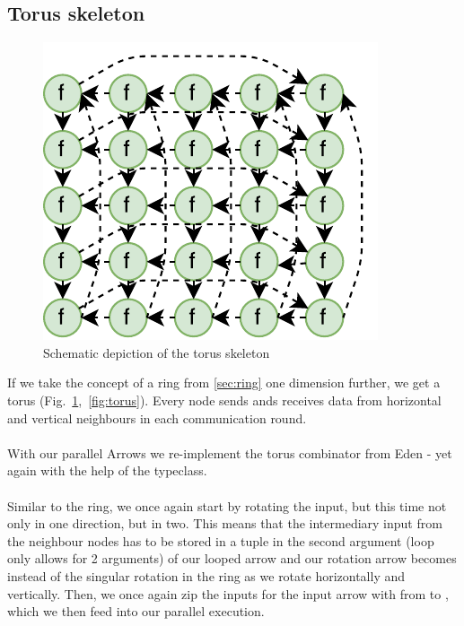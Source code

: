 \subsection{Torus skeleton}
\begin{figure}
	\includegraphics[scale=0.75]{images/torus}
	\caption{Schematic depiction of the torus skeleton}
	\label{fig:ringTorusImg}
\end{figure}
If we take the concept of a ring from \ref{sec:ring} one dimension further, we get a torus (Fig.~\ref{fig:ringTorusImg},~\ref{fig:torus}). Every node sends ands receives data from horizontal and vertical neighbours in each communication round.
\\\\
With our parallel Arrows we re-implement the torus combinator from Eden \citep{eden_skel_topology} - yet again with the help of the  typeclass.
\\\\
Similar to the ring, we once again start by rotating the input, but this time not only in one direction, but in two. This means that the intermediary input from the neighbour nodes has to be stored in a tuple \code{([[fut a]], [[fut b]])} in the second argument (loop only allows for 2 arguments) of our looped arrow  and our rotation arrow becomes  instead of the singular rotation in the ring as we rotate \code{[[fut a]]} horizontally and \code{[[fut b]]} vertically. Then, we once again zip the inputs for the input arrow with  from \code{([[c]], ([[fut a]], [[fut b]]))} to , which we then feed into our parallel execution.

